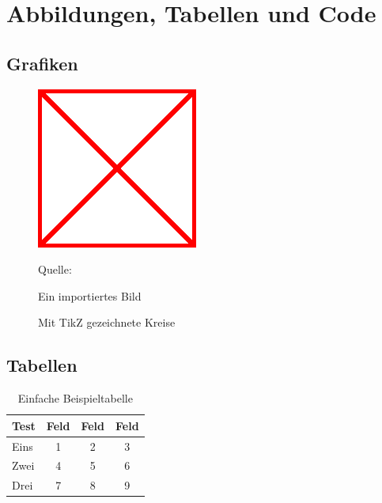 \chapter{Abbildungen, Tabellen und Code}
\label{chp:Abbildungen_Tabellen_und_Code}

\section{Grafiken}
\label{sec:Grafiken}

\begin{figure}[ht!]
	\centering
	\includegraphics[width=0.25\linewidth]{images/example-image.png}
	\caption{Ein importiertes Bild}
	\label{fig:imported}
	Quelle: 
\end{figure}

\begin{figure}[ht!]
	\centering
	\caption{Mit TikZ gezeichnete Kreise}
	\label{fig:drawn}
\end{figure}

\section{Tabellen}
\label{sec:Tabellen}

\begin{table}[ht!]
	\centering
	\begin{tabular}{l|ccc}
		Test & Feld & Feld & Feld \\
		\hline
		Eins & 1 & 2 & 3 \\
		Zwei & 4 & 5 & 6 \\
		Drei & 7 & 8 & 9 \\
	\end{tabular}
	\caption{Einfache Beispieltabelle}
	\label{tab:plaintable}
\end{table}

